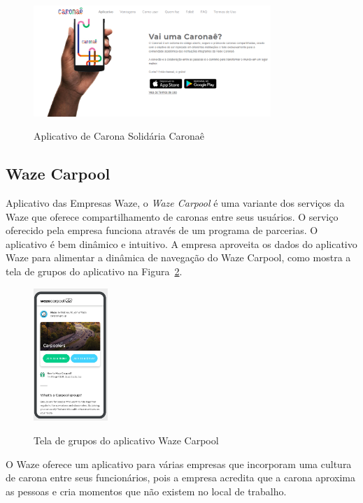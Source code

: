\begin{figure}[!hbtp]
	\centering
	\caption{Aplicativo de Carona Solidária Caronaê}
	\includegraphics[width=0.8\textwidth]{./04-figuras/caronae.png}
	\label{fig:caronae}
\end{figure}



\subsection{Waze Carpool}
Aplicativo das Empresas Waze, o \textit{Waze Carpool} é uma variante dos serviços da Waze que oferece compartilhamento de caronas entre seus usuários. O serviço oferecido pela empresa funciona através de um programa de parcerias. O aplicativo é bem dinâmico e intuitivo. A empresa aproveita os dados do aplicativo Waze para alimentar a dinâmica de navegação do Waze Carpool, como mostra a tela de grupos do aplicativo na Figura~\ref{fig:tela_grupos_wazecarpool}.

\begin{figure}[!hbtp]
	\centering
	\caption{Tela de grupos do aplicativo Waze Carpool}
	\includegraphics[width=0.25\textwidth]{./04-figuras/waze/Tela_de_grupos.png}
	\label{fig:tela_grupos_wazecarpool}
\end{figure}

O Waze oferece um aplicativo para várias empresas que incorporam uma cultura de carona entre seus funcionários, pois a empresa acredita que a carona aproxima as pessoas e cria momentos que não existem no local de trabalho.


